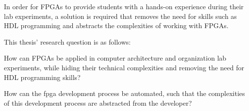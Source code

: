 \documentclass[main.tex]{subfiles}
\begin{document}
In order for FPGAs to provide students with a hands-on experience during their lab experiments, a solution is required 
that removes the need for skills such as HDL programming and abstracts the complexities of working with FPGAs.

This thesis' research question is as follows: 

\begin{displayquote}
How can FPGAs be applied in computer architecture and organization lab experiments, while hiding their technical complexities and removing the need for HDL programming skills?
\end{displayquote}

How can the fpga development process be automated, such that the complexities of this development process are abstracted from the developer?
\end{document}
